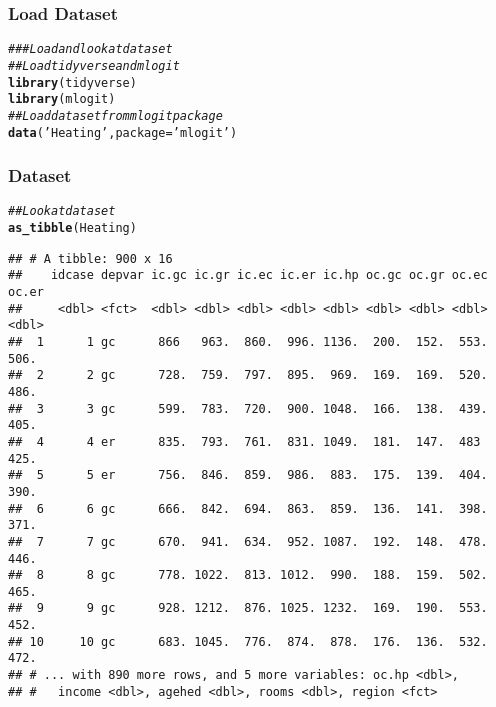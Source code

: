 \documentclass{beamer}\usepackage[]{graphicx}\usepackage[]{color}
\makeatletter
\newcommand{\hlstr}[1]{\textcolor[rgb]{0.192,0.494,0.8}{#1}}%
\newcommand{\hlcom}[1]{\textcolor[rgb]{0.678,0.584,0.686}{\textit{#1}}}%
\newcommand{\hlstd}[1]{\textcolor[rgb]{0.345,0.345,0.345}{#1}}%
\newcommand{\hlkwc}[1]{\textcolor[rgb]{0.333,0.667,0.333}{#1}}%
\newcommand{\hlkwd}[1]{\textcolor[rgb]{0.737,0.353,0.396}{\textbf{#1}}}%
\newenvironment{kframe}{%
 \def\at@end@of@kframe{}%
 \ifinner\ifhmode%
  \def\at@end@of@kframe{\end{minipage}}%
  \begin{minipage}{\columnwidth}%
 \fi\fi%
 \def\FrameCommand##1{\hskip\@totalleftmargin \hskip-\fboxsep
 \colorbox{shadecolor}{##1}\hskip-\fboxsep
     \hskip-\linewidth \hskip-\@totalleftmargin \hskip\columnwidth}%
 \MakeFramed {\advance\hsize-\width
   \@totalleftmargin\z@ \linewidth\hsize
   \@setminipage}}%
 {\par\unskip\endMakeFramed%
 \at@end@of@kframe}
\newenvironment{knitrout}{}{} %
\makeatother
\begin{document}
\begin{frame}[fragile]\frametitle{Load Dataset}
\begin{knitrout}\footnotesize
{}\color{fgcolor}\begin{kframe}
\begin{alltt}
\hlcom{### Load and look at dataset}
\hlcom{## Load tidyverse and mlogit}
\hlkwd{library}\hlstd{(tidyverse)}
\hlkwd{library}\hlstd{(mlogit)}
\hlcom{## Load dataset from mlogit package}
\hlkwd{data}\hlstd{(}\hlstr{'Heating'}\hlstd{,} \hlkwc{package} \hlstd{=} \hlstr{'mlogit'}\hlstd{)}
\end{alltt}
\end{kframe}
\end{knitrout}
\end{frame}

\begin{frame}[fragile]\frametitle{Dataset}
\begin{knitrout}\footnotesize
{}\color{fgcolor}\begin{kframe}
\begin{alltt}
\hlcom{## Look at dataset}
\hlkwd{as_tibble}\hlstd{(Heating)}
\end{alltt}
\begin{verbatim}
## # A tibble: 900 x 16
##    idcase depvar ic.gc ic.gr ic.ec ic.er ic.hp oc.gc oc.gr oc.ec oc.er
##     <dbl> <fct>  <dbl> <dbl> <dbl> <dbl> <dbl> <dbl> <dbl> <dbl> <dbl>
##  1      1 gc      866   963.  860.  996. 1136.  200.  152.  553.  506.
##  2      2 gc      728.  759.  797.  895.  969.  169.  169.  520.  486.
##  3      3 gc      599.  783.  720.  900. 1048.  166.  138.  439.  405.
##  4      4 er      835.  793.  761.  831. 1049.  181.  147.  483   425.
##  5      5 er      756.  846.  859.  986.  883.  175.  139.  404.  390.
##  6      6 gc      666.  842.  694.  863.  859.  136.  141.  398.  371.
##  7      7 gc      670.  941.  634.  952. 1087.  192.  148.  478.  446.
##  8      8 gc      778. 1022.  813. 1012.  990.  188.  159.  502.  465.
##  9      9 gc      928. 1212.  876. 1025. 1232.  169.  190.  553.  452.
## 10     10 gc      683. 1045.  776.  874.  878.  176.  136.  532.  472.
## # ... with 890 more rows, and 5 more variables: oc.hp <dbl>,
## #   income <dbl>, agehed <dbl>, rooms <dbl>, region <fct>
\end{verbatim}
\end{kframe}
\end{knitrout}
\end{frame}
\end{document}
